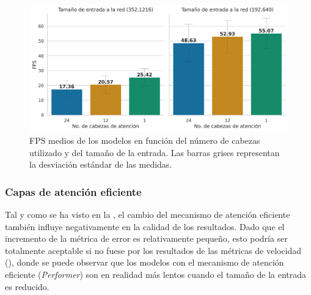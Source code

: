 \begin{figure}[H]
\centering
\includegraphics[width=0.75\linewidth]{imagenes/Resultados/velocidad_inferencia_cabezas_atencion.png} 
\captionsetup{width=.8\linewidth}
\caption{FPS medios de los modelos en función del número de cabezas utilizado y del tamaño de la entrada. Las barras grises representan la desviación estándar de las medidas.}
\label{fig:resultados-inf-num-cabezas}
\end{figure}
























\subsubsection{Capas de atención eficiente}\label{resultados-cuantitativos-atencion}
Tal y como se ha visto en la , el cambio del mecanismo de atención eficiente también influye negativamente en la calidad de los resultados. Dado que el incremento de la métrica de error es relativamente pequeño, esto podría ser totalmente aceptable si no fuese por los resultados de las métricas de velocidad (), donde se puede observar que los modelos con el mecanismo de atención eficiente (\textit{Performer}) son en realidad más lentos cuando el tamaño de la entrada es reducido.

